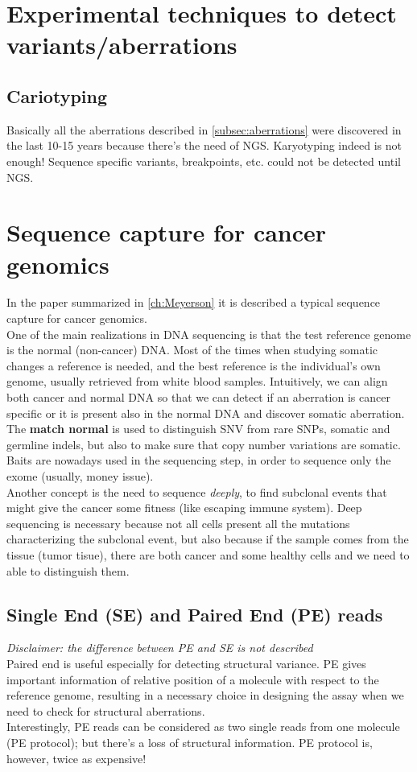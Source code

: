 \section{Experimental techniques to detect variants/aberrations}
\subsection{Cariotyping}
Basically all the aberrations described in \ref{subsec:aberrations} were discovered in the last 10-15 years because there's the need of NGS.
Karyotyping indeed is not enough!
Sequence specific variants, breakpoints, etc. could not be detected until NGS.

\section{Sequence capture for cancer genomics}
In the paper summarized in \ref{ch:Meyerson} it is described a typical sequence capture for cancer genomics. \\
One of the main realizations in DNA sequencing is that the test reference genome is the normal (non-cancer) DNA.
Most of the times when studying somatic changes a reference is needed, and the best reference is the individual's own genome, usually retrieved from white blood samples.
Intuitively, we can align both cancer and normal DNA so that we can detect if an aberration is cancer specific or it is present also in the normal DNA and discover somatic aberration.
The \textbf{match normal} is used to distinguish SNV from rare SNPs, somatic and germline indels, but also to make sure that copy number variations are somatic.
Baits are nowadays used in the sequencing step, in order to sequence only the exome (usually, money issue). \\

Another concept is the need to sequence \textit{deeply}, to find subclonal events that might give the cancer some fitness (like escaping immune system). Deep sequencing is necessary because not all cells present all the mutations characterizing the subclonal event, but also because if the sample comes from the tissue (tumor tisue), there are both cancer and some healthy cells and we need to able to distinguish them.


\subsection{Single End (SE) and Paired End (PE) reads} \label{SE_PE}
\textit{Disclaimer: the difference between PE and SE is not described}\\
Paired end is useful especially for detecting structural variance. PE gives important information of relative position of a molecule with respect to the reference genome, resulting in a necessary choice in designing the assay when we need to check for structural aberrations. \\
Interestingly, PE reads can be considered as two single reads from one molecule (PE protocol); but there's a loss of structural information.
PE protocol is, however, twice as expensive!

